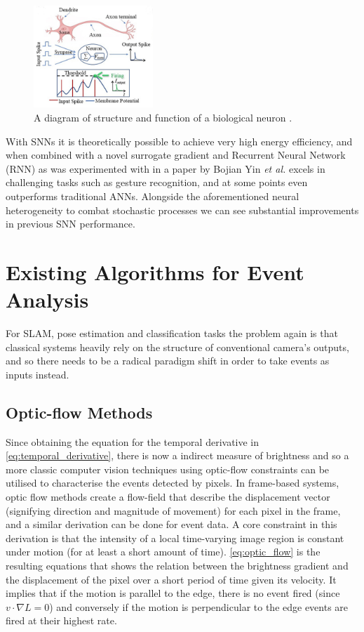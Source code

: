 \begin{figure}[htb]
      \centering
      \includegraphics[width=0.4\textwidth]{background/images/biological_neuron.png}
      \caption{A diagram of structure and function of a biological neuron \cite{BiologicalNeuronModel}.}
      \label{fig:biological_neuron}
\end{figure}

With SNNs it is theoretically possible to achieve very high energy efficiency, and when combined with a novel surrogate gradient and Recurrent Neural Network (RNN) as was experimented with in a paper by Bojian Yin \textit{et al.}\cite{EfficientSNN} excels in challenging tasks such as gesture recognition, and at some points even outperforms traditional ANNs. Alongside the aforementioned neural heterogeneity to combat stochastic processes we can see substantial improvements in previous SNN performance.

\section{Existing Algorithms for Event Analysis} \label{sec:existing_algorithms}

For SLAM, pose estimation and classification tasks the problem again is that classical systems heavily rely on the structure of conventional camera's outputs, and so there needs to be a radical paradigm shift in order to take events as inputs instead.

\subsection{Optic-flow Methods}

Since obtaining the equation for the temporal derivative in \autoref{eq:temporal_derivative}, there is now a indirect measure of brightness and so a more classic computer vision techniques using optic-flow constraints can be utilised to characterise the events detected by pixels. In frame-based systems, optic flow methods create a flow-field that describe the displacement vector (signifying direction and magnitude of movement) for each pixel in the frame, and a similar derivation can be done for event data. A core constraint in this derivation is that the intensity of a local time-varying image region is constant under motion (for at least a short amount of time)\cite{GenerativeEventModel}. \autoref{eq:optic_flow} is the resulting equations that shows the relation between the brightness gradient and the displacement of the pixel over a short period of time given its velocity\cite{EventBasedVisionASurvery}. It implies that if the motion is parallel to the edge, there is no event fired (since $ v \cdot \nabla L = 0  $) and conversely if the motion is perpendicular to the edge events are fired at their highest rate.


